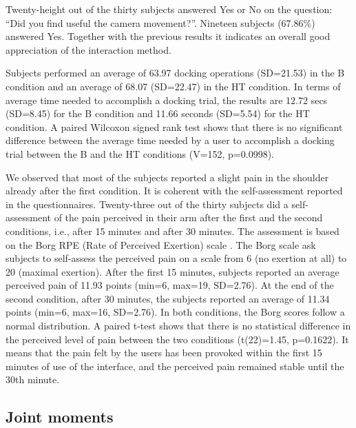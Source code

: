 Twenty-height out of the thirty subjects answered Yes or No on the question: ``Did you find useful the camera movement?''. Nineteen subjects (67.86\%) answered Yes.
Together with the previous results it indicates an overall good appreciation of the interaction method.

Subjects performed an average of 63.97 docking operations (SD=21.53) in the B condition and an average of 68.07 (SD=22.47) in the HT condition.
In terms of average time needed to accomplish a docking trial, the results are 12.72 secs (SD=8.45) for the B condition and 11.66 seconds (SD=5.54) for the HT condition.
A paired Wilcoxon signed rank test shows that there is no significant difference between the average time needed by a user to accomplish a docking trial between the B and the HT conditions (V=152, p=0.0998).


We observed that most of the subjects reported a slight pain in the shoulder already after the first condition. It is coherent with the self-assessment reported in the questionnaires.
Twenty-three out of the thirty subjects did a self-assessment of the pain perceived in their arm after the first and the second conditions, i.e., after 15 minutes and after 30 minutes. The assessment is based on the Borg RPE (Rate of Perceived Exertion) scale \cite{borg_borgs_1998}.
The Borg scale ask subjects to self-assess the perceived pain on a scale from 6 (no exertion at all) to 20 (maximal exertion).
After the first 15 minutes, subjects reported an average perceived pain of 11.93 points (min=6, max=19, SD=2.76). At the end of the second condition, after 30 minutes, the subjects reported an average of 11.34 points (min=6, max=16, SD=2.76).
In both conditions, the Borg scores follow a normal distribution. A paired t-test shows that there is no statistical difference in the perceived level of pain between the two conditions (t(22)=1.45, p=0.1622).
It means that the pain felt by the users has been provoked within the first 15 minutes of use of the interface, and the perceived pain remained stable until the 30th minute.


\subsection{Joint moments}

